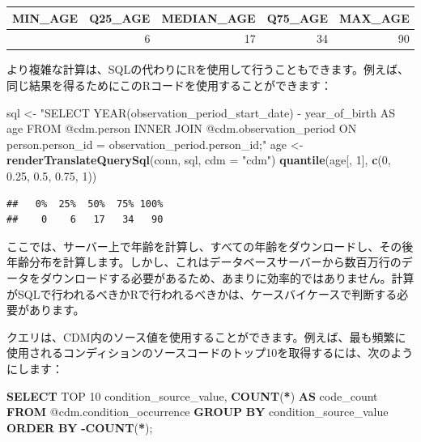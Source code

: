 \documentclass[
  11pt]{book}
\newenvironment{Shaded}{\begin{snugshade}}{\end{snugshade}}
\newcommand{\AttributeTok}[1]{\textcolor[rgb]{0.13,0.29,0.53}{#1}}
\newcommand{\DecValTok}[1]{\textcolor[rgb]{0.00,0.00,0.81}{#1}}
\newcommand{\FloatTok}[1]{\textcolor[rgb]{0.00,0.00,0.81}{#1}}
\newcommand{\FunctionTok}[1]{\textcolor[rgb]{0.13,0.29,0.53}{\textbf{#1}}}
\newcommand{\KeywordTok}[1]{\textcolor[rgb]{0.13,0.29,0.53}{\textbf{#1}}}
\newcommand{\NormalTok}[1]{#1}
\newcommand{\OperatorTok}[1]{\textcolor[rgb]{0.81,0.36,0.00}{\textbf{#1}}}
\newcommand{\OtherTok}[1]{\textcolor[rgb]{0.56,0.35,0.01}{#1}}
\newcommand{\StringTok}[1]{\textcolor[rgb]{0.31,0.60,0.02}{#1}}
\theoremstyle{definition}
\theoremstyle{definition}
\theoremstyle{definition}
\theoremstyle{definition}
\theoremstyle{remark}
\begin{document}
\begin{longtable}[]{@{}rrrrr@{}}
\toprule\noalign{}
MIN\_AGE & Q25\_AGE & MEDIAN\_AGE & Q75\_AGE & MAX\_AGE \\
\midrule\noalign{}
\endhead
\bottomrule\noalign{}
\endlastfoot
0 & 6 & 17 & 34 & 90 \\
\end{longtable}

より複雑な計算は、SQLの代わりにRを使用して行うこともできます。例えば、同じ結果を得るためにこのRコードを使用することができます：

\begin{Shaded}
\begin{Highlighting}[]
\NormalTok{sql }\OtherTok{\textless{}{-}} \StringTok{"SELECT YEAR(observation\_period\_start\_date) {-}}
\StringTok{               year\_of\_birth AS age}
\StringTok{FROM @cdm.person}
\StringTok{INNER JOIN @cdm.observation\_period}
\StringTok{  ON person.person\_id = observation\_period.person\_id;"}
\NormalTok{age }\OtherTok{\textless{}{-}} \FunctionTok{renderTranslateQuerySql}\NormalTok{(conn, sql, }\AttributeTok{cdm =} \StringTok{"cdm"}\NormalTok{)}
\FunctionTok{quantile}\NormalTok{(age[, }\DecValTok{1}\NormalTok{], }\FunctionTok{c}\NormalTok{(}\DecValTok{0}\NormalTok{, }\FloatTok{0.25}\NormalTok{, }\FloatTok{0.5}\NormalTok{, }\FloatTok{0.75}\NormalTok{, }\DecValTok{1}\NormalTok{))}
\end{Highlighting}
\end{Shaded}

\begin{verbatim}
##   0%  25%  50%  75% 100%
##    0    6   17   34   90
\end{verbatim}

ここでは、サーバー上で年齢を計算し、すべての年齢をダウンロードし、その後年齢分布を計算します。しかし、これはデータベースサーバーから数百万行のデータをダウンロードする必要があるため、あまりに効率的ではありません。計算がSQLで行われるべきかRで行われるべきかは、ケースバイケースで判断する必要があります。

クエリは、CDM内のソース値を使用することができます。例えば、最も頻繁に使用されるコンディションのソースコードのトップ10を取得するには、次のようにします：

\begin{Shaded}
\begin{Highlighting}[]
\KeywordTok{SELECT}\NormalTok{ TOP }\DecValTok{10}\NormalTok{ condition\_source\_value,}
  \FunctionTok{COUNT}\NormalTok{(}\OperatorTok{*}\NormalTok{) }\KeywordTok{AS}\NormalTok{ code\_count}
\KeywordTok{FROM}\NormalTok{ @cdm.condition\_occurrence}
\KeywordTok{GROUP} \KeywordTok{BY}\NormalTok{ condition\_source\_value}
\KeywordTok{ORDER} \KeywordTok{BY} \OperatorTok{{-}}\FunctionTok{COUNT}\NormalTok{(}\OperatorTok{*}\NormalTok{);}
\end{Highlighting}
\end{Shaded}
\end{document}
